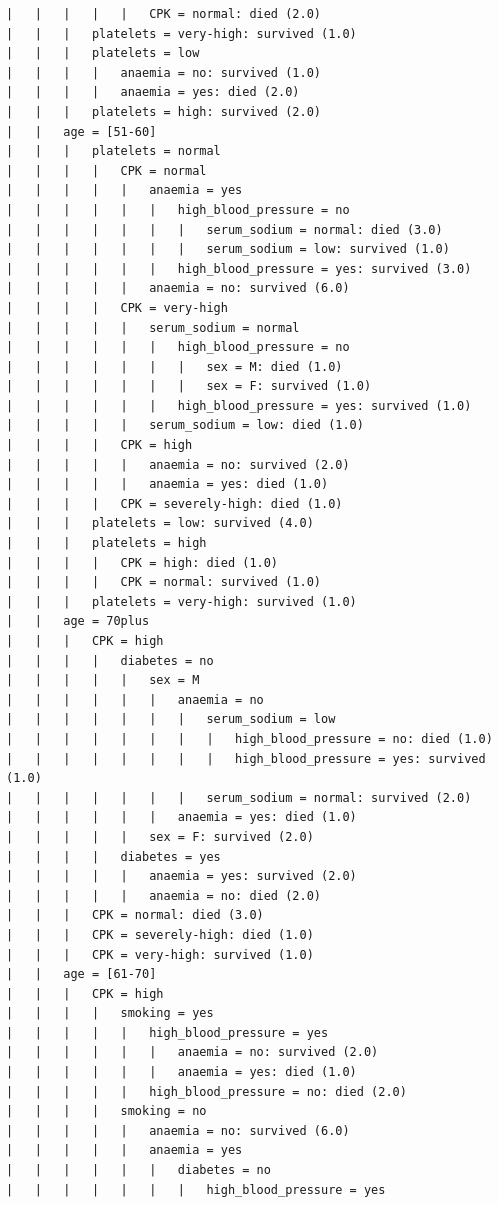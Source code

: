 \documentclass[12pt,a4paper]{article}
\begin{document}
{\begin{verbatim}
|   |   |   |   |   CPK = normal: died (2.0)
|   |   |   platelets = very-high: survived (1.0)
|   |   |   platelets = low
|   |   |   |   anaemia = no: survived (1.0)
|   |   |   |   anaemia = yes: died (2.0)
|   |   |   platelets = high: survived (2.0)
|   |   age = [51-60]
|   |   |   platelets = normal
|   |   |   |   CPK = normal
|   |   |   |   |   anaemia = yes
|   |   |   |   |   |   high_blood_pressure = no
|   |   |   |   |   |   |   serum_sodium = normal: died (3.0)
|   |   |   |   |   |   |   serum_sodium = low: survived (1.0)
|   |   |   |   |   |   high_blood_pressure = yes: survived (3.0)
|   |   |   |   |   anaemia = no: survived (6.0)
|   |   |   |   CPK = very-high
|   |   |   |   |   serum_sodium = normal
|   |   |   |   |   |   high_blood_pressure = no
|   |   |   |   |   |   |   sex = M: died (1.0)
|   |   |   |   |   |   |   sex = F: survived (1.0)
|   |   |   |   |   |   high_blood_pressure = yes: survived (1.0)
|   |   |   |   |   serum_sodium = low: died (1.0)
|   |   |   |   CPK = high
|   |   |   |   |   anaemia = no: survived (2.0)
|   |   |   |   |   anaemia = yes: died (1.0)
|   |   |   |   CPK = severely-high: died (1.0)
|   |   |   platelets = low: survived (4.0)
|   |   |   platelets = high
|   |   |   |   CPK = high: died (1.0)
|   |   |   |   CPK = normal: survived (1.0)
|   |   |   platelets = very-high: survived (1.0)
|   |   age = 70plus
|   |   |   CPK = high
|   |   |   |   diabetes = no
|   |   |   |   |   sex = M
|   |   |   |   |   |   anaemia = no
|   |   |   |   |   |   |   serum_sodium = low
|   |   |   |   |   |   |   |   high_blood_pressure = no: died (1.0)
|   |   |   |   |   |   |   |   high_blood_pressure = yes: survived (1.0)
|   |   |   |   |   |   |   serum_sodium = normal: survived (2.0)
|   |   |   |   |   |   anaemia = yes: died (1.0)
|   |   |   |   |   sex = F: survived (2.0)
|   |   |   |   diabetes = yes
|   |   |   |   |   anaemia = yes: survived (2.0)
|   |   |   |   |   anaemia = no: died (2.0)
|   |   |   CPK = normal: died (3.0)
|   |   |   CPK = severely-high: died (1.0)
|   |   |   CPK = very-high: survived (1.0)
|   |   age = [61-70]
|   |   |   CPK = high
|   |   |   |   smoking = yes
|   |   |   |   |   high_blood_pressure = yes
|   |   |   |   |   |   anaemia = no: survived (2.0)
|   |   |   |   |   |   anaemia = yes: died (1.0)
|   |   |   |   |   high_blood_pressure = no: died (2.0)
|   |   |   |   smoking = no
|   |   |   |   |   anaemia = no: survived (6.0)
|   |   |   |   |   anaemia = yes
|   |   |   |   |   |   diabetes = no
|   |   |   |   |   |   |   high_blood_pressure = yes

\end{verbatim}}
\end{document}
